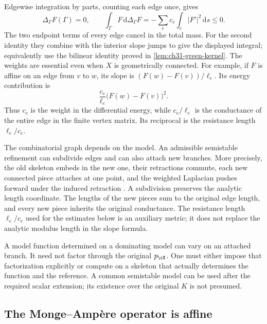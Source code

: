 Edgewise integration by parts, counting each edge once, gives
\begin{equation}
\label{eq:graph-dirichlet-sign}
 \Delta_\Gamma F(\Gamma)=0,\qquad
 \int_\Gamma F\,\mathrm d\Delta_\Gamma F
       =-\sum_e c_e\int_e|F'|^2\,\mathrm ds\leq0.
\end{equation}
The two endpoint terms of every edge cancel in the total mass.
For the second identity they combine with the interior slope jumps
to give the displayed integral; equivalently use the bilinear
identity proved in \cref{lem:ch31-green-kernel}.
The weights are essential even when \(X\) is geometrically connected.
For example, if \(F\) is affine on an edge from \(v\) to \(w\), its
slope is \((F(w)-F(v))/\ell_e\).  Its energy contribution is
\[
             \frac{c_e}{\ell_e}\bigl(F(w)-F(v)\bigr)^2.
\]
Thus \(c_e\) is the weight in the differential energy, while
\(c_e/\ell_e\) is the conductance of the entire edge in the finite
vertex matrix.  Its reciprocal is the resistance length
\(\ell_e/c_e\).

\begin{remark}
\label{rem:ch31-lengths}
The combinatorial graph depends on the model.  An admissible
semistable refinement can subdivide edges and can also attach new
branches.  More precisely, the old skeleton embeds in the new one,
their retractions commute, each new connected piece attaches at one
point, and the weighted Laplacian pushes forward under the induced
retraction \cite[Proposition~2.2.26]{Thu05}.
A subdivision preserves the analytic length coordinate.  The lengths
of the new pieces sum to the original edge length, and every new
piece inherits the original conductance.  The resistance length
\(\ell_e/c_e\) used for the estimates below is an auxiliary metric;
it does not replace the analytic modulus length in the slope formula.

A model function determined on a dominating model can vary on an
attached branch.  It need not factor through the original \(p_{\cX}\).
One must either impose that factorization explicitly or compute on
a skeleton that actually determines the function and the reference.
A common semistable model can be used after the required scalar
extension; its existence over the original \(K\) is not presumed.
\end{remark}

\subsection{The Monge--Amp\`ere operator is affine}
\label{sec:ch31-curve-affine}

